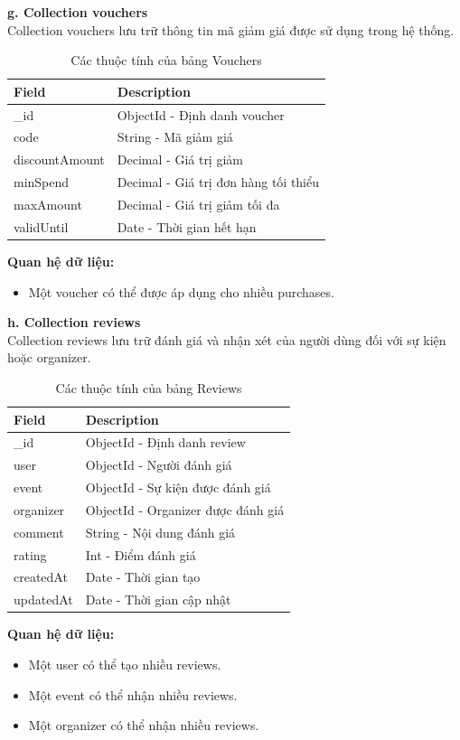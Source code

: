 \textbf{g. Collection vouchers}\\
Collection vouchers lưu trữ thông tin mã giảm giá được sử dụng trong hệ thống.
\setlength{\LTleft}{0pt}
\setlength{\LTright}{0pt}
\begin{longtable}{|p{4cm}|p{11.2cm}|}
\caption{Các thuộc tính của bảng Vouchers}\\[15pt]
\hline
\textbf{Field} & \textbf{Description} \\ \hline
\_id & ObjectId - Định danh voucher \\ \hline
code & String - Mã giảm giá \\ \hline
discountAmount & Decimal - Giá trị giảm \\ \hline
minSpend & Decimal - Giá trị đơn hàng tối thiểu \\ \hline
maxAmount & Decimal - Giá trị giảm tối đa \\ \hline
validUntil & Date - Thời gian hết hạn \\ \hline
\end{longtable}
\textbf{Quan hệ dữ liệu:}
\begin{itemize}
    \item[-] Một voucher có thể được áp dụng cho nhiều purchases.
\end{itemize}

\textbf{h. Collection reviews}\\
Collection reviews lưu trữ đánh giá và nhận xét của người dùng đối với sự kiện hoặc organizer.
\setlength{\LTleft}{0pt}
\setlength{\LTright}{0pt}
\begin{longtable}{|p{4cm}|p{11.2cm}|}
\caption{Các thuộc tính của bảng Reviews}\\[15pt]
\hline
\textbf{Field} & \textbf{Description} \\ \hline
\_id & ObjectId - Định danh review \\ \hline
user & ObjectId - Người đánh giá \\ \hline
event & ObjectId - Sự kiện được đánh giá \\ \hline
organizer & ObjectId - Organizer được đánh giá \\ \hline
comment & String - Nội dung đánh giá \\ \hline
rating & Int - Điểm đánh giá \\ \hline
createdAt & Date - Thời gian tạo \\ \hline
updatedAt & Date - Thời gian cập nhật \\ \hline
\end{longtable}
\textbf{Quan hệ dữ liệu:}
\begin{itemize}
    \item[-] Một user có thể tạo nhiều reviews.
    \item[-] Một event có thể nhận nhiều reviews.
    \item[-] Một organizer có thể nhận nhiều reviews.
\end{itemize}

